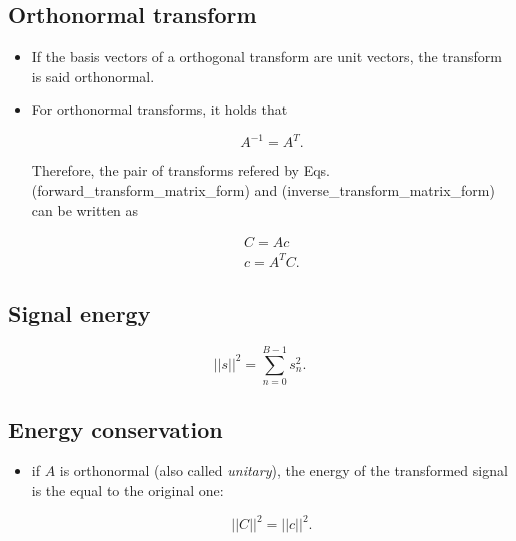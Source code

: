     \hypertarget{orthonormal-transform}{%
\subsection{Orthonormal transform}\label{orthonormal-transform}}

\begin{itemize}
\item
  If the basis vectors of a orthogonal transform are unit vectors, the
  transform is said orthonormal.
\item
  For orthonormal transforms, it holds that

  \begin{equation}
    A^{-1} = A^T.
  \end{equation}

  Therefore, the pair of transforms refered by Eqs.
  (forward\_transform\_matrix\_form) and
  (inverse\_transform\_matrix\_form) can be written as

  \begin{equation}
    \begin{array}{l}
      C=Ac \\
      c=A^TC.
    \end{array}
  \end{equation}
\end{itemize}

    \hypertarget{signal-energy}{%
\subsection{Signal energy}\label{signal-energy}}

\begin{equation}
  ||s||^2 = \sum_{n=0}^{B-1}s_n^2.
\end{equation}

    \hypertarget{energy-conservation}{%
\subsection{Energy conservation}\label{energy-conservation}}

\begin{itemize}
\item
  if \(A\) is orthonormal (also called \emph{unitary}), the energy of
  the transformed signal is the equal to the original one:

  \begin{equation}
     ||C||^2 = ||c||^2.
  \end{equation}
\end{itemize}

